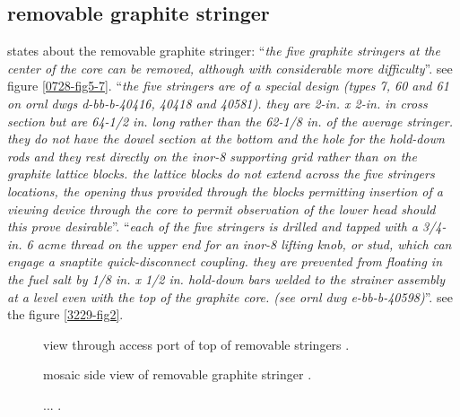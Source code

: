 \documentclass{article}
\newcommand*{\mrsarchive}{../../msr-archive}%
\begin{document}
\subsection{removable graphite stringer}
\parencite[page 84]{ornl-tm-0728} states about the removable graphite stringer:
\enquote{\textit{the five graphite stringers at the center of the core can be removed, although with considerable more difficulty}}.
see figure \ref{0728-fig5-7}.
\enquote{\textit{the five stringers are of a special design (types 7, 60 and 61 on ornl dwgs d-bb-b-40416, 40418 and 40581). they are 2-in. x 2-in. in cross section but are 64-1/2 in. long rather than the 62-1/8 in. of the average stringer. they do not have the dowel section at the bottom and the hole for the hold-down rods and they rest directly on the inor-8 supporting grid rather than on the graphite lattice blocks. the lattice blocks do not extend across the five stringers locations, the opening thus provided through the blocks permitting insertion of a viewing device through the core to permit observation of the lower head should this prove desirable}}.
\enquote{\textit{each of the five stringers is drilled and tapped with a 3/4-in. 6 acme thread on the upper end for an inor-8 lifting knob, or stud, which can engage a snaptite quick-disconnect coupling. they are prevented from floating in the fuel salt by 1/8 in. x 1/2 in. hold-down bars welded to the strainer assembly at a level even with the top of the graphite core. (see ornl dwg e-bb-b-40598)}}.
see the figure \ref{3229-fig2}.

\begin{figure}[H]
  \centering
  \centering
  \caption{view through access port of top of removable stringers \parencite[figure 1.3]{ornl-4676}.}
  \label{4676-fig1-3}
\end{figure}

\begin{figure}[H]
  \centering
  \centering
  \caption{mosaic side view of removable graphite stringer \parencite[figure 13.1]{ornl-4676}.}
  \label{4676-fig13-1}
\end{figure}

\begin{figure}[H]
  \centering
  \centering
  \caption{... \parencite[figure 13.2]{ornl-4676}.}
  \label{4676-fig13-2}
\end{figure}
\end{document}
